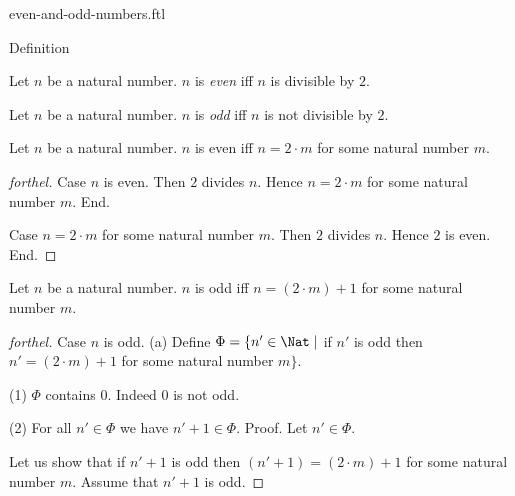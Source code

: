 \documentclass{naproche-library}
\begin{document}
\begin{smodule}[title=Even and Odd Numbers]{even-and-odd-numbers.ftl}

\begin{sfragment}{Definition}
  \begin{definition}[forthel,id=ARITHMETIC_15_4521358965847512]
    Let $n$ be a natural number.
    $n$ is \emph{even} iff $n$ is divisible by $2$.
  \end{definition}

  \begin{definition}[forthel,id=ARITHMETIC_15_1023652125874596]
    Let $n$ be a natural number.
    $n$ is \emph{odd} iff $n$ is not divisible by $2$.
  \end{definition}

  \begin{proposition}[forthel,id=ARITHMETIC_15_0236985458752156]
    Let $n$ be a natural number.
    $n$ is even iff $n = 2 \cdot m$ for some natural number $m$.
  \end{proposition}
  \begin{proof}[forthel]
    Case $n$ is even.
      Then $2$ divides $n$.
      Hence $n = 2 \cdot m$ for some natural number $m$.
    End.

    Case $n = 2 \cdot m$ for some natural number $m$.
      Then $2$ divides $n$.
      Hence $2$ is even.
    End.
  \end{proof}

  \begin{proposition}[forthel,id=ARITHMETIC_15_1023512547854265]
    Let $n$ be a natural number.
    $n$ is odd iff $n = (2 \cdot m) + 1$ for some natural number $m$.
  \end{proposition}
  \begin{proof}[forthel]
    Case $n$ is odd.
      (a) Define $\Phi = \{ n' \in \Nat \mid$ if $n'$ is odd then $n' = (2 \cdot m) + 1$ for some natural number $m \}$.

      (1) $\Phi$ contains $0$.
      Indeed $0$ is not odd.

      (2) For all $n' \in \Phi$ we have $n' + 1 \in \Phi$. \newline
      Proof.
        Let $n' \in \Phi$.

        Let us show that if $n' + 1$ is odd then $(n' + 1) = (2 \cdot m) + 1$ for some natural number $m$.
          Assume that $n' + 1$ is odd.


\end{proof}
\end{sfragment}
\end{smodule}
\end{document}
